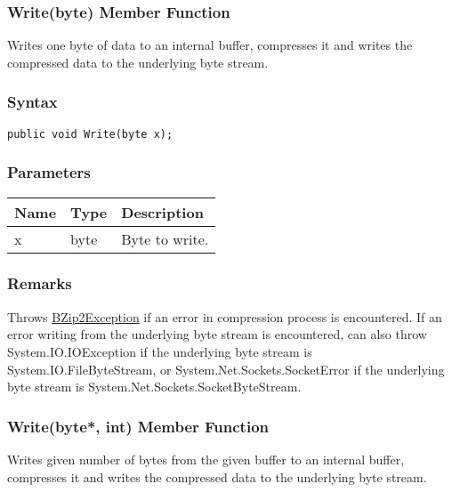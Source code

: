\documentclass[a4paper,oneside,11.000000pt]{book}
\begin{document}
\hypertarget{System.IO.Compression.BZip2Stream.Write.P.System.IO.Compression.BZip2Stream.byte}{\subsubsection*{Write(byte) Member Function}}
\begin{flushleft}
Writes one byte of data to an internal buffer, compresses it and writes the compressed data
to the underlying byte stream.

\end{flushleft}
\subsubsection*{Syntax}\texttt{public void Write(byte x);}

\subsubsection*{Parameters}
\begin{flushleft}
\begin{supertabular}[l]{lll}
\textbf{Name}
& \textbf{Type}
& \textbf{Description}
\\
\hline
x
& byte
& Byte to write.

\\
\end{supertabular}

\end{flushleft}
\subsubsection*{Remarks}
\begin{flushleft}
Throws \hyperlink{System.IO.Compression.BZip2Exception}{BZip2Exception} if an error in compression process is encountered.
If an error writing from the underlying byte stream is encountered, 
can also throw System.\-IO.\-IOException if the underlying byte stream is System.\-IO.\-FileByteStream, or
System.\-Net.\-Sockets.\-SocketError if the underlying byte stream is System.\-Net.\-Sockets.\-SocketByteStream.

\end{flushleft}
\clearpage

\hypertarget{System.IO.Compression.BZip2Stream.Write.P.System.IO.Compression.BZip2Stream.P.byte.int}{\subsubsection*{Write(byte*, int) Member Function}}
\begin{flushleft}
Writes given number of bytes from the given buffer to an internal buffer, 
compresses it and writes the compressed data to the underlying byte stream.

\end{flushleft}
\end{document}
